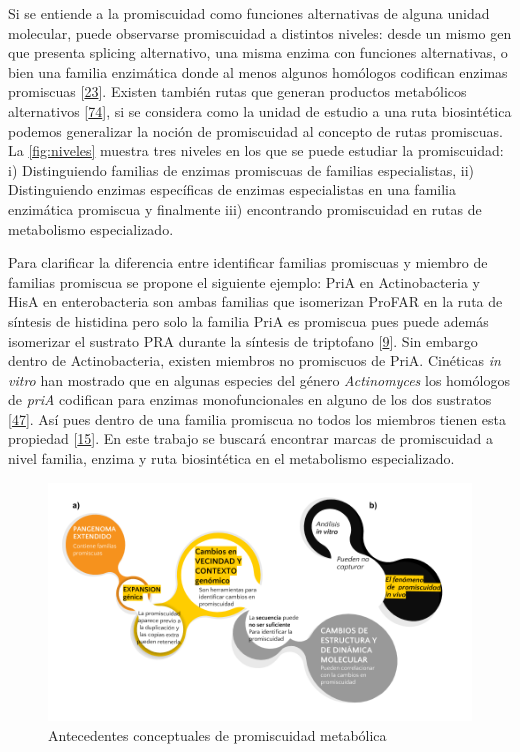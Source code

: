 \documentclass[12pt,twoside]{reedthesis}
\begin{document}
  Si se entiende a la promiscuidad como funciones alternativas de alguna
  unidad molecular, puede observarse promiscuidad a distintos niveles:
  desde un mismo gen que presenta splicing alternativo, una misma enzima
  con funciones alternativas, o bien una familia enzimática donde al menos
  algunos homólogos codifican enzimas promiscuas
  {[}\protect\hyperlink{ref-nobeli_protein_2009}{23}{]}. Existen también
  rutas que generan productos metabólicos alternativos
  {[}\protect\hyperlink{ref-lamble_archaea_promiscuou_pathways_2003}{74}{]},
  si se considera como la unidad de estudio a una ruta biosintética
  podemos generalizar la noción de promiscuidad al concepto de rutas
  promiscuas. La \autoref{fig:niveles} muestra tres niveles en los que se
  puede estudiar la promiscuidad: i) Distinguiendo familias de enzimas
  promiscuas de familias especialistas, ii) Distinguiendo enzimas
  específicas de enzimas especialistas en una familia enzimática promiscua
  y finalmente iii) encontrando promiscuidad en rutas de metabolismo
  especializado.
  
  Para clarificar la diferencia entre identificar familias promiscuas y
  miembro de familias promiscua se propone el siguiente ejemplo: PriA en
  Actinobacteria y HisA en enterobacteria son ambas familias que
  isomerizan ProFAR en la ruta de síntesis de histidina pero solo la
  familia PriA es promiscua pues puede además isomerizar el sustrato PRA
  durante la síntesis de triptofano
  {[}\protect\hyperlink{ref-baronagomez_occurrence_2003}{9}{]}. Sin
  embargo dentro de Actinobacteria, existen miembros no promiscuos de
  PriA. Cinéticas \emph{in vitro} han mostrado que en algunas especies del
  género \emph{Actinomyces} los homólogos de \emph{priA} codifican para
  enzimas monofuncionales en alguno de los dos sustratos
  {[}\protect\hyperlink{ref-juarez-vazquez_evolution_2017}{47}{]}. Así
  pues dentro de una familia promiscua no todos los miembros tienen esta
  propiedad {[}\protect\hyperlink{ref-bloom_neutral_2007}{15}{]}. En este
  trabajo se buscará encontrar marcas de promiscuidad a nivel familia,
  enzima y ruta biosintética en el metabolismo especializado.
  
  \begin{figure}[h!tbp]
  \centering
  \includegraphics[angle = 0,scale = 0.5]{chapter0/AntecedentesConceptuales.png}
  \caption[Antecedentes conceptuales de promiscuidad metabólica]{\normalsize{Antecedentes conceptuales de promiscuidad metabólica}}
  \label{fig:Antecedentes}
  \end{figure}
  
\end{document}
